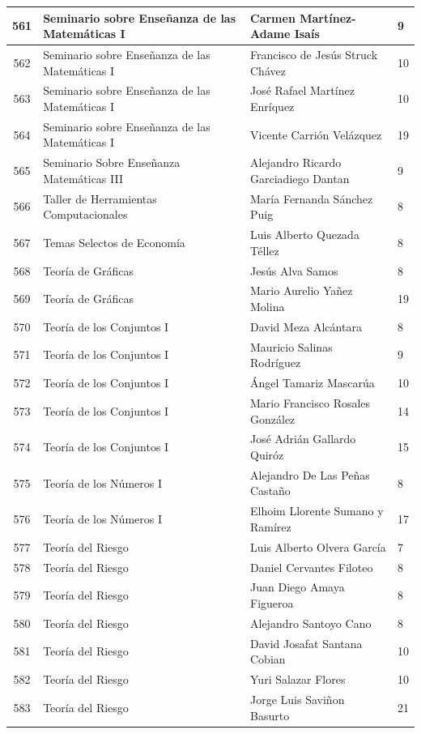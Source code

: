 {\begin{longtable}{|c|p{6.5cm}|p{5cm}|p{1.5cm}|}
561 & Seminario sobre Enseñanza de las Matemáticas I & Carmen Martínez-Adame Isaís & 9 \\ \hline
562 & Seminario sobre Enseñanza de las Matemáticas I & Francisco de Jesús Struck Chávez & 10 \\ \hline
563 & Seminario sobre Enseñanza de las Matemáticas I & José Rafael Martínez Enríquez & 10 \\ \hline
564 & Seminario sobre Enseñanza de las Matemáticas I & Vicente Carrión Velázquez & 19 \\ \hline
565 & Seminario Sobre Enseñanza Matemáticas III & Alejandro Ricardo Garciadiego Dantan & 9 \\ \hline
566 & Taller de Herramientas Computacionales & María Fernanda Sánchez Puig & 8 \\ \hline
567 & Temas Selectos de Economía & Luis Alberto Quezada Téllez & 8 \\ \hline
568 & Teoría de Gráficas & Jesús Alva Samos & 8 \\ \hline
569 & Teoría de Gráficas & Mario Aurelio Yañez Molina & 19 \\ \hline
570 & Teoría de los Conjuntos I & David Meza Alcántara & 8 \\ \hline
571 & Teoría de los Conjuntos I & Mauricio Salinas Rodríguez & 9 \\ \hline
572 & Teoría de los Conjuntos I & Ángel Tamariz Mascarúa & 10 \\ \hline
573 & Teoría de los Conjuntos I & Mario Francisco Rosales González & 14 \\ \hline
574 & Teoría de los Conjuntos I & José Adrián Gallardo Quiróz & 15 \\ \hline
575 & Teoría de los Números I & Alejandro De Las Peñas Castaño & 8 \\ \hline
576 & Teoría de los Números I & Elhoim Llorente Sumano y Ramírez & 17 \\ \hline
577 & Teoría del Riesgo & Luis Alberto Olvera García & 7 \\ \hline
578 & Teoría del Riesgo & Daniel Cervantes Filoteo & 8 \\ \hline
579 & Teoría del Riesgo & Juan Diego Amaya Figueroa & 8 \\ \hline
580 & Teoría del Riesgo & Alejandro Santoyo Cano & 8 \\ \hline
581 & Teoría del Riesgo & David Josafat Santana Cobian & 10 \\ \hline
582 & Teoría del Riesgo & Yuri Salazar Flores & 10 \\ \hline
583 & Teoría del Riesgo & Jorge Luis Saviñon Basurto & 21 \\ \hline

\end{longtable}}

